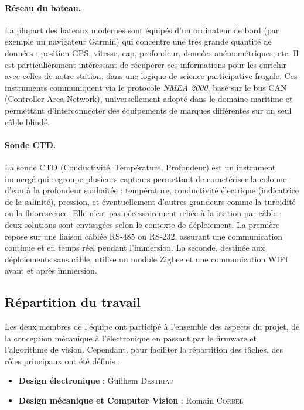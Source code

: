 \paragraph{Réseau du bateau.}
La plupart des bateaux modernes sont équipés d'un ordinateur de bord (par exemple un navigateur Garmin) qui concentre une très grande quantité de données : position GPS, vitesse, cap, profondeur, données anémométriques, etc. Il est particulièrement intéressant de récupérer ces informations pour les enrichir avec celles de notre station, dans une logique de science participative frugale. Ces instruments communiquent via le protocole \textit{NMEA 2000}, basé sur le bus CAN (Controller Area Network), universellement adopté dans le domaine maritime et permettant d'interconnecter des équipements de marques différentes sur un seul câble blindé.

\paragraph{Sonde CTD.}
La sonde CTD (Conductivité, Température, Profondeur) est un instrument immergé qui regroupe plusieurs capteurs permettant de caractériser la colonne d'eau à la profondeur souhaitée : température, conductivité électrique (indicatrice de la salinité), pression, et éventuellement d'autres grandeurs comme la turbidité ou la fluorescence. Elle n'est pas nécessairement reliée à la station par câble : deux solutions sont envisagées selon le contexte de déploiement. La première repose sur une liaison câblée RS-485 ou RS-232, assurant une communication continue et en temps réel pendant l'immersion. La seconde, destinée aux déploiements sans câble, utilise un module Zigbee et une communication WIFI avant et après immersion.

\subsection{Répartition du travail}

Les deux membres de l'équipe ont participé à l'ensemble des aspects du projet, de la conception mécanique à l'électronique en passant par le firmware et l'algorithme de vision. Cependant, pour faciliter la répartition des tâches, des rôles principaux ont été définis :

\begin{itemize}
  \item \textbf{Design électronique} : Guilhem \textsc{Destriau}
  \item \textbf{Design mécanique et Computer Vision} : Romain \textsc{Corbel} 
\end{itemize}
